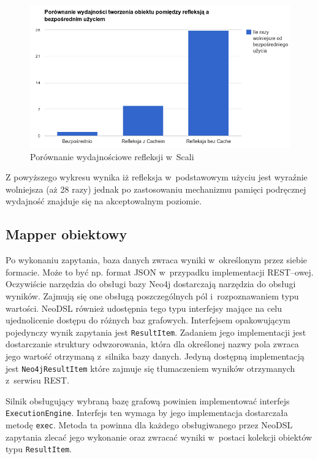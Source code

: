 \documentclass[brudnopis]{xmgr}
\begin{document}
\begin{figure}[H]
	\includegraphics[scale=0.6]{images/reflection-comparison.png}
	\caption{Porównanie wydajnościowe refleksji w~Scali}
	\label{fig:reflection_comparison}
\end{figure}

Z powyższego wykresu wynika iż refleksja w~podstawowym użyciu jest wyraźnie wolniejsza (aż 28 razy) jednak po zastosowaniu mechanizmu pamięci podręcznej wydajność znajduje się na akceptowalnym poziomie.

\subsection{Mapper obiektowy}

Po wykonaniu zapytania, baza danych zwraca wyniki w~określonym przez siebie formacie. Może to być np. format JSON w~przypadku implementacji REST--owej. Oczywiście narzędzia do obsługi bazy Neo4j dostarczają narzędzia do obsługi wyników. Zajmują się one obsługą poszczególnych pól i~rozpoznawaniem typu wartości. NeoDSL również udostępnia tego typu interfejsy mające na celu ujednolicenie dostępu do różnych baz grafowych. Interfejsem opakowującym pojedynczy wynik zapytania jest \texttt{ResultItem}. Zadaniem jego implementacji jest dostarczanie struktury odwzorowania, która dla określonej nazwy pola zwraca jego wartość otrzymaną z~silnika bazy danych. Jedyną dostępną implementacją jest \texttt{Neo4jResultItem} które zajmuje się tłumaczeniem wyników otrzymanych z~serwisu REST.

Silnik obsługujący wybraną bazę grafową powinien implementować interfejs \texttt{ExecutionEngine}. Interfejs ten wymaga by jego implementacja dostarczała metodę \texttt{exec}. Metoda ta powinna dla każdego obsługiwanego przez NeoDSL zapytania zlecać jego wykonanie oraz zwracać wyniki w~postaci kolekcji obiektów typu \texttt{ResultItem}.
\end{document}
